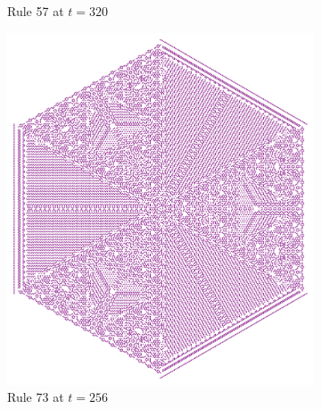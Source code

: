 \documentclass{article}
\begin{document}
\begin{figure}[H]
\begin{subfigure}[b]{0.45\textwidth}
{        }
        \caption{Rule 57 at $t=320$}
        \label{fig:rule-57-time-320-OneAlive}
    \end{subfigure}
    \break
    \begin{subfigure}[b]{0.45\textwidth}
        \centering
        \includegraphics[width=\textwidth]{graphics/behavior/beauty/rule-73-time-256-OneAlive.pdf}
        \caption{Rule 73 at $t=256$}
        \label{fig:rule-73-time-256-OneAlive}
    \end{subfigure}
    \begin{subfigure}[b]{0.45\textwidth}
        \centering

\end{subfigure}
\end{figure}
\end{document}
